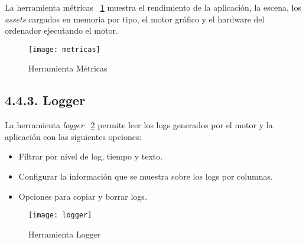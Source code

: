 La herramienta métricas \figurename~\ref{metrics_tool} muestra el rendimiento de la aplicación, 
la escena, los \textit{assets} cargados en memoria por tipo, el motor gráfico y el hardware del ordenador ejecutando el motor.

\begin{figure}[h!]
    \centering
    \texttt{[image: metricas]}
    \caption{Herramienta Métricas}
    \label{metrics_tool}
\end{figure}

\subsection*{4.4.3. Logger}\label{sec:workflow_debugger_logger}

La herramienta \textit{logger} \figurename~\ref{logger_tool} permite leer los logs generados por el motor y la aplicación
con las siguientes opciones:
\begin{itemize}
    \item Filtrar por nivel de log, tiempo y texto.
    \item Configurar la información que se muestra sobre los logs por columnas.
    \item Opciones para copiar y borrar logs.
\end{itemize}

\begin{figure}[h!]
    \centering
    \texttt{[image: logger]}
    \caption{Herramienta Logger}
    \label{logger_tool}
\end{figure}

\emptyPage